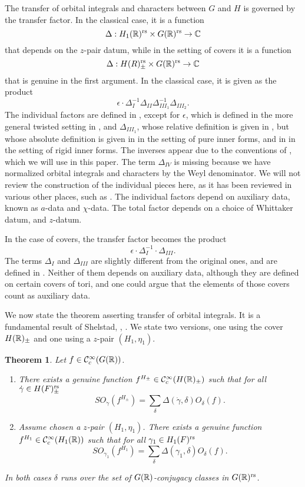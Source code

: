 \documentclass{article}
\newtheorem{thm}{Theorem}[subsection]
\theoremstyle{definition}
\numberwithin{equation}{section}
\renewcommand{\-}{\hyp{}}
\begin{document}
The transfer of orbital integrals and characters between $G$ and $H$ is governed by the transfer factor. In the classical case, it is a function
\[ \Delta : H_1(\mathbb{R})^{\textrm{rs}} \times G(\mathbb{R})^{\textrm{rs}} \to \mathbb{C} \]
that depends on the $z$-pair datum, while in the setting of covers it is a function
\[ \Delta : H(R)_\pm^{\textrm{rs}} \times G(\mathbb{R})^{\textrm{rs}} \to \mathbb{C} \]
that is genuine in the first argument. In the classical case, it is given as the product
\[ \epsilon \cdot \Delta_I^{-1}\Delta_{II}\Delta_{III_1}^{-1}\Delta_{III_2}. \]
The individual factors are defined in \cite{LS87}, except for $\epsilon$, which is defined in the more general twisted setting in \cite[\S5.3]{KS99}, and $\Delta_{III_1}$, whose relative definition is given in \cite{LS87}, but whose absolute definition is given in \cite{KalECI} in the setting of pure inner forms, and in \cite{KalRI} in the setting of rigid inner forms. The inverses appear due to the conventions of \cite[(1.0.4)]{KS12}, which we will use in this paper. The term $\Delta_{IV}$ is missing because we have normalized orbital integrals and characters by the Weyl denominator. We will not review the construction of the individual pieces here, as it has been reviewed in various other places, such as \cite[\S3.5,\S4.2,\S4.3]{KalIMS}. The individual factors depend on auxiliary data, known as $a$-data and $\chi$-data. The total factor depends on a choice of Whittaker datum, and $z$-datum.

In the case of covers, the transfer factor becomes the product
\[ \epsilon \cdot \Delta_I^{-1} \cdot \Delta_{III}.\]
The terms $\Delta_I$ and $\Delta_{III}$ are slightly different from the original ones, and are defined in \cite[\S4.3]{KalHDC}. Neither of them depends on auxiliary data, although they are defined on certain covers of tori, and one could argue that the elements of those covers count as auxiliary data.

We now state the theorem asserting transfer of orbital integrals. It is a fundamental result of Shelstad, \cite{She82}, \cite{SheTE1}. We state two versions, one using the cover $H(\mathbb{R})_\pm$ and one using a $z$-pair $(H_1,\eta_1)$.
\begin{thm}
Let $f \in \mathcal{C}_c^\infty(G(\mathbb{R}))$.
\begin{enumerate}
	\item There exists a genuine function $f^{H_\pm} \in \mathcal{C}_c^\infty(H(\mathbb{R})_\pm)$ such that for all $\dot\gamma \in H(F)_\pm^{\textrm{rs}}$
	\[ SO_{\dot\gamma}(f^{H_\pm}) = \sum_\delta \Delta(\dot\gamma,\delta) O_\delta(f). \]
	\item Assume chosen a $z$-pair $(H_1,\eta_1)$. There exists a genuine function $f^{H_1} \in \mathcal{C}_c^\infty(H_1(\mathbb{R}))$ such that for all $\gamma_1 \in H_1(F)^{\textrm{rs}}$
	\[ SO_{\gamma_1}(f^{H_1}) = \sum_\delta \Delta(\gamma_1,\delta) O_\delta(f). \]
\end{enumerate}
In both cases $\delta$ runs over the set of $G(\mathbb{R})$-conjugacy classes in $G(\mathbb{R})^{\textrm{rs}}$.
\end{thm}
\end{document}
